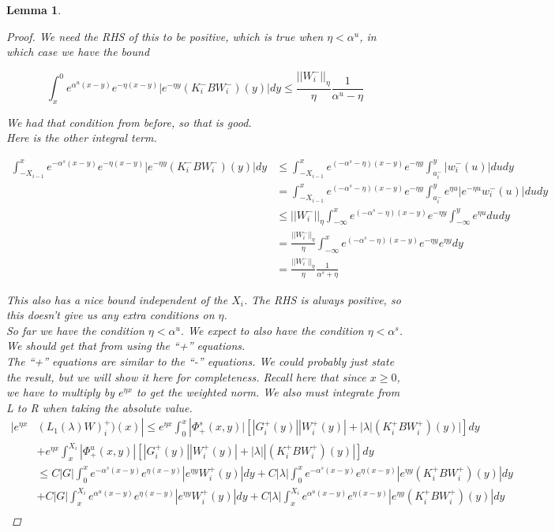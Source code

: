 \documentclass[12pt]{article}
\newtheorem{lemma}{Lemma}
\begin{document}
\begin{lemma}
\begin{proof}
We need the RHS of this to be positive, which is true when $\eta < \alpha^u$, in which case we have the bound

\[
\int_x^0 e^{\alpha^u (x-y)}e^{-\eta(x-y)}|e^{-\eta y} (K_i^- B W_i^-)(y)| dy \leq 
\frac{||W_i^-||_\eta}{\eta} \frac{1}{\alpha^u - \eta} 
\]

We had that condition from before, so that is good.\\

Here is the other integral term. 

\begin{align*}
\int_{-X_{i-1}}^x e^{-\alpha^s (x-y)}e^{-\eta(x-y)}|e^{-\eta y} (K_i^- B W_i^-)(y)| dy &\leq \int_{-X_{i-1}}^x e^{(-\alpha^s - \eta)(x-y)}e^{-\eta y} \int_{a_i^-}^y |w_i^-(u)| du dy \\
&= \int_{-X_{i-1}}^x e^{(-\alpha^s - \eta)(x-y)}e^{-\eta y} \int_{a_i^-}^y e^{\eta u} |e^{-\eta u} w_i^-(u)| du dy \\
&\leq ||W_i^-||_\eta \int_{-\infty}^x e^{(-\alpha^s - \eta)(x-y)}e^{-\eta y} \int_{-\infty}^y e^{\eta u} du dy \\
&= \frac{||W_i^-||_\eta}{\eta} \int_{-\infty}^x e^{(-\alpha^s - \eta)(x-y)}e^{-\eta y} e^{\eta y} dy \\
&= \frac{||W_i^-||_\eta}{\eta} \frac{1}{\alpha^s + \eta}
\end{align*}

This also has a nice bound independent of the $X_i$. The RHS is always positive, so this doesn't give us any extra conditions on $\eta$.\\

So far we have the condition $\eta < \alpha^u$. We expect to also have the condition $\eta < \alpha^s$. We should get that from using the ``+'' equations.\\

The ``+'' equations are similar to the ``-'' equations. We could probably just state the result, but we will show it here for completeness. Recall here that since $x \geq 0$, we have to multiply by $e^{\eta x}$ to get the weighted norm. We also must integrate from L to R when taking the absolute value.\\

\begin{align*}
|e^{\eta x} & (L_1(\lambda)W)_i^+)(x) | \leq e^{\eta x} \int_0^x |\Phi^s_+(x, y)|[|G_i^+(y)||W_i^+(y)| + |\lambda|(K_i^+ B W_i^+)(y)| ] dy \\
&+ e^{\eta x} \int_x^{X_i} |\Phi^u_+(x, y)|[|G_i^+(y)||W_i^+(y)| + |\lambda||(K_i^+ B W_i^+)(y)| ] dy \\
&\leq C|G| \int_0^x e^{-\alpha^s (x-y)}e^{\eta(x-y)}|e^{\eta y} W_i^+(y)| dy 
+ C|\lambda|\int_0^x e^{-\alpha^s (x-y)}e^{\eta(x-y)}|e^{\eta y} (K_i^+ B W_i^+)(y)| dy \\
&+ C|G| \int_x^{X_i} e^{\alpha^u (x-y)}e^{\eta(x-y)}|e^{\eta y} W_i^+(y)| dy 
+ C|\lambda|\int_x^{X_i} e^{\alpha^u (x-y)}e^{\eta(x-y)}|e^{\eta y} (K_i^+ B W_i^+)(y)| dy \\ 
\end{align*}


\end{proof}
\end{lemma}
\end{document}
